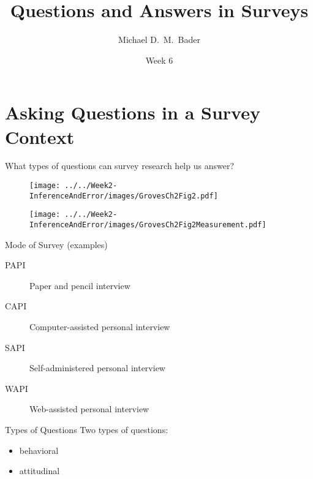 \documentclass[]{beamer}
\title[Questions \& Answers]{Questions and Answers in Surveys}
\author[Bader--SOCY 625]
{Michael D.~M.~Bader}
\institute 
{
  Practicum in Sociological Research (SOCY 625)
}
\date %
{Week 6}
\begin{document}
\begin{frame}
  \titlepage
\end{frame}

\section{Asking Questions in a Survey Context}

\begin{frame}
What types of questions can survey research help us answer?
\end{frame}

\begin{frame}
\begin{figure}[h!]
\begin{center}
\texttt{[image: ../../Week2-InferenceAndError/images/GrovesCh2Fig2.pdf]}
\end{center}
\end{figure}
\end{frame}

\begin{frame}
\begin{figure}[h!]
\begin{center}
\texttt{[image: ../../Week2-InferenceAndError/images/GrovesCh2Fig2Measurement.pdf]}
\end{center}
\end{figure}
\end{frame}

\begin{frame}{Mode of Survey (examples)}
\begin{description}
\item[PAPI] Paper and pencil interview
\item[CAPI] Computer-assisted personal interview
\item[SAPI] Self-administered personal interview
\item[WAPI] Web-assisted personal interview
\end{description}
\end{frame}

\begin{frame}{Types of Questions}
Two types of questions:
\begin{itemize}
\item behavioral 
\item attitudinal
\end{itemize}
\end{frame}
\end{document}
